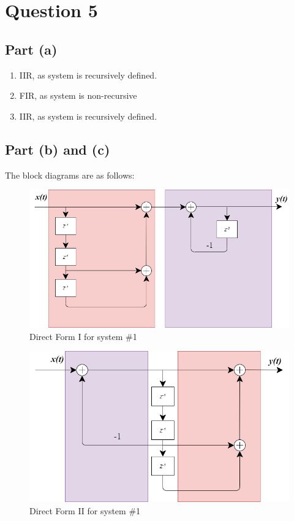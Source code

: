 \documentclass[12pt,letterpaper]{article}
\begin{document}
\pagebreak
\section*{Question 5}
\subsection*{Part (a)}
\begin{enumerate}
    \item IIR, as system is recursively defined. 
    \item FIR, as system is non-recursive
    \item IIR, as system is recursively defined. 
\end{enumerate}
\subsection*{Part (b) and (c)}
The block diagrams are as follows: 

\begin{figure}[!htb]
    \centering
    \includegraphics[scale = 0.6]{figures/HW1Q5b1.png}
    \caption{Direct Form I for system \#1}
    \label{5a}
\end{figure}

\begin{figure}[!htb]
    \centering
    \includegraphics[scale = 0.6]{figures/HW1Q5b3.png}
    \caption{Direct Form II for system \#1}
    \label{5a}
\end{figure}
\end{document}

